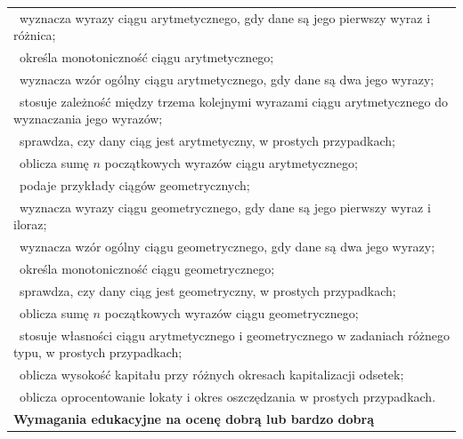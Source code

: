 \documentclass[12pt,a4paper]{article}
\begin{document}
\begin{longtable}{|p{16cm}|}
		\textbullet\ wyznacza wyrazy ciągu arytmetycznego, gdy dane są jego pierwszy wyraz i różnica; \\
		
		\textbullet\ określa monotoniczność ciągu arytmetycznego; \\
		
		\textbullet\ wyznacza wzór ogólny ciągu arytmetycznego, gdy dane są dwa jego wyrazy; \\
		
		\textbullet\ stosuje zależność między trzema kolejnymi wyrazami ciągu arytmetycznego do wyznaczania jego wyrazów; \\
		
		\textbullet\ sprawdza, czy dany ciąg jest arytmetyczny, w prostych przypadkach; \\
		
		\textbullet\ oblicza sumę $n$ początkowych wyrazów ciągu arytmetycznego; \\
		
		\textbullet\ podaje przykłady ciągów geometrycznych; \\
		
		\textbullet\ wyznacza wyrazy ciągu geometrycznego, gdy dane są jego pierwszy wyraz i iloraz; \\
		
		\textbullet\ wyznacza wzór ogólny ciągu geometrycznego, gdy dane są dwa jego wyrazy; \\
		
		\textbullet\ określa monotoniczność ciągu geometrycznego; \\
		
		\textbullet\ sprawdza, czy dany ciąg jest geometryczny, w prostych przypadkach; \\
		
		\textbullet\ oblicza sumę $n$ początkowych wyrazów ciągu geometrycznego; \\
		
		\textbullet\ stosuje własności ciągu arytmetycznego i geometrycznego w zadaniach różnego typu, w prostych przypadkach; \\
		
		\textbullet\ oblicza wysokość kapitału przy różnych okresach kapitalizacji odsetek; \\
		
		\textbullet\ oblicza oprocentowanie lokaty i okres oszczędzania w prostych przypadkach. \\ \hline
		
		\textbf{Wymagania edukacyjne na ocenę dobrą lub bardzo dobrą} \\ \hline
		

\end{longtable}
\end{document}
